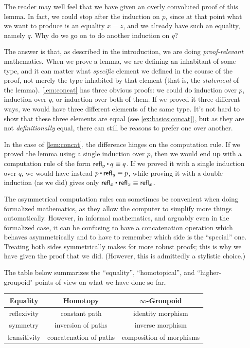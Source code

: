 The reader may well feel that we have given an overly convoluted proof of this lemma.
In fact, we could stop after the induction on $p$, since at that point what we want to produce is an equality $x=z$, and we already have such an equality, namely $q$.
Why do we go on to do another induction on $q$?

The answer is that, as described in the introduction, we are doing \emph{proof-relevant} mathematics.
%
When we prove a lemma, we are defining an inhabitant of some type, and it can matter what \emph{specific} element we defined in the course of the proof, not merely the type inhabited by that element (that is, the \emph{statement} of the lemma).
\cref{lem:concat} has three obvious proofs: we could do induction over $p$, induction over $q$, or induction over both of them.
If we proved it three different ways, we would have three different elements of the same type.
It's not hard to show that these three elements are equal (see \cref{ex:basics:concat}), but as they are not \emph{definitionally} equal, there can still be reasons to prefer one over another.

In the case of \cref{lem:concat}, the difference hinges on the computation rule.
If we proved the lemma using a single induction over $p$, then we would end up with a computation rule of the form $\refl{y} \ct q \jdeq q$.
If we proved it with a single induction over $q$, we would have instead $p\ct\refl{y}\jdeq p$, while proving it with a double induction (as we did) gives only $\refl{x}\ct\refl{x} \jdeq \refl{x}$.

%
The asymmetrical computation rules can sometimes be convenient when doing formalized mathematics, as they allow the computer to simplify more things automatically.
However, in informal mathematics, and arguably even in the formalized case, it can be confusing to have a concatenation operation which behaves asymmetrically and to have to remember which side is the ``special'' one.
Treating both sides symmetrically makes for more robust proofs; this is why we have given the proof that we did.
(However, this is admittedly a stylistic choice.)

The table below summarizes the ``equality'', ``homotopical'', and ``higher-groupoid" points of view on what we have done so far.
\begin{center}
  \medskip
  \begin{tabular}{ccc}
    \toprule
    Equality & Homotopy & $\infty$-Groupoid\\
    \midrule
    reflexivity\index{equality!reflexivity of} & constant path & identity morphism\\
    symmetry\index{equality!symmetry of} & inversion of paths & inverse morphism\\
    transitivity\index{equality!transitivity of} & concatenation of paths & composition of morphisms\\
    \bottomrule
  \end{tabular}
  \medskip
\end{center}

